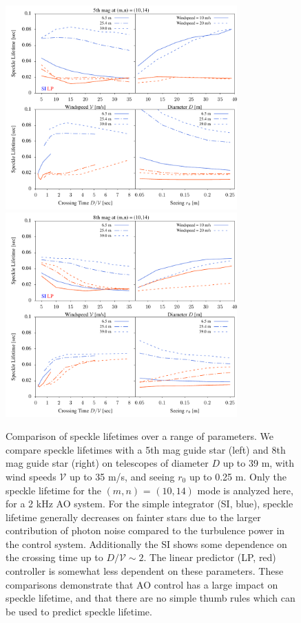 \documentclass[10pt,preprint]{aastex631}
\begin{document}
\begin{figure}
    \includegraphics[width=3.5in]{scalings_rel_5.pdf}
    \includegraphics[width=3.5in]{scalings_rel_8.pdf}
    \caption{Comparison of speckle lifetimes over a range of parameters.  We compare speckle lifetimes with a 5th mag guide star (left) and 8th mag guide star (right) on telescopes of diameter $D$ up to 39 m, with wind speeds $\mathcal{V}$ up to 35 m/s, and seeing $r_0$ up to 0.25 m.  Only the speckle lifetime for the $(m,n)$ = $(10,14)$ mode is analyzed here, for a 2 kHz AO system.  For the simple integrator (SI, blue), speckle lifetime generally decreases on fainter stars due to the larger contribution of photon noise compared to the turbulence power in the control system.  Additionally the SI shows some dependence on the crossing time up to $D/\mathcal{V}\sim2$.  The linear predictor (LP, red) controller is somewhat less dependent on these parameters.  These comparisons demonstrate that AO control has a large impact on speckle lifetime, and that there are no simple thumb rules which can be used to predict speckle lifetime.  \label{fig:scalings}}    
\end{figure}
\end{document}
